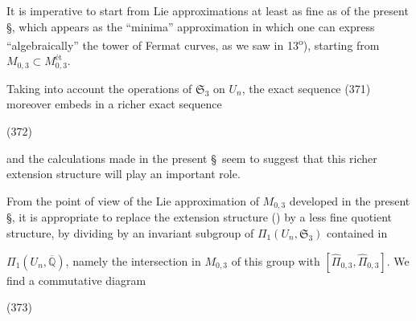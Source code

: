 
It is imperative to start from Lie approximations at least as fine as  of the present \S, which appears as the ``minima'' approximation in which one can express ``algebraically'' the tower of Fermat curves,  as we saw in 13\textsuperscript{o}), starting from $M_{0,3}\subset M_{0,3}^{\text{ét}}$.

Taking into account the operations of $\mathfrak S_3$ on $U_n$, the exact sequence (371) moreover embeds in a richer exact sequence

\noindent (372)

and the calculations made in the present \S\ seem to suggest that this richer extension structure will play an important role.

From the point of view of the Lie approximation of $M_{0,3}$ developed in the present \S, it is appropriate to replace the extension structure () by a less fine quotient structure, by dividing by an invariant subgroup of $\Pi_1(U_n,\mathfrak S_3)$ contained in


$\Pi_1(U_n,\overline{\mathbb Q})$, namely the intersection in $M_{0,3}$ of this group with $[\widehat\Pi_{0,3},\widehat\Pi_{0,3}]$. We find a commutative diagram

\noindent (373)


